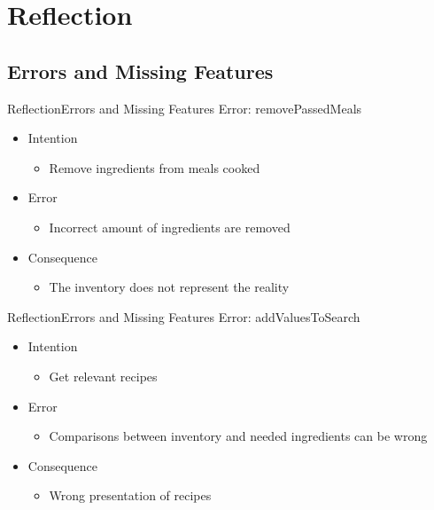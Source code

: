 \section{Reflection}
\subsection{Errors and Missing Features}
\begin{frame}{Reflection}{Errors and Missing Features}%
	Error: removePassedMeals 
	\begin{itemize}
		\item Intention
			\begin{itemize}
			\item Remove ingredients from meals cooked
			\end{itemize}
		\item Error
			\begin{itemize}
			\item Incorrect amount of ingredients are removed
			\end{itemize}
		\item Consequence
			\begin{itemize}
			\item The inventory does not represent the reality
			\end{itemize}
	\end{itemize}
\end{frame}
\begin{frame}{Reflection}{Errors and Missing Features}	
		Error: addValuesToSearch
		\begin{itemize}
			\item Intention
				\begin{itemize}
				\item Get relevant recipes
				\end{itemize}
			\item Error
				\begin{itemize}
				\item Comparisons between inventory and needed ingredients can be wrong 
				\end{itemize}
			\item Consequence
				\begin{itemize}
				\item Wrong presentation of recipes
				\end{itemize}
		\end{itemize}
\end{frame}

